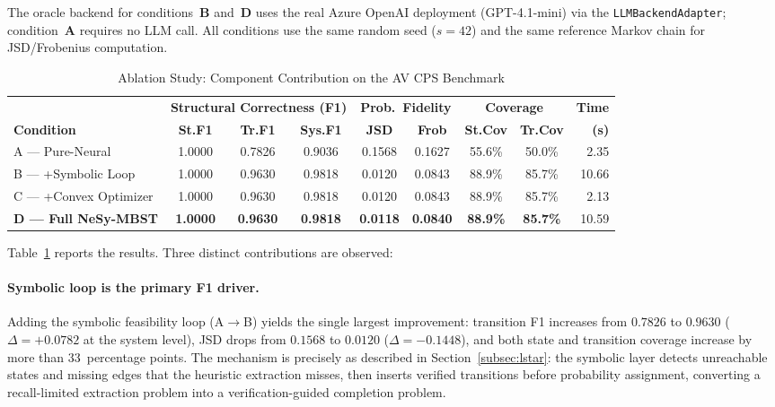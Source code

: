 The oracle backend for conditions~\textbf{B} and~\textbf{D} uses the
real Azure OpenAI deployment (GPT-4.1-mini) via the \texttt{LLMBackendAdapter};
condition~\textbf{A} requires no LLM call.  All conditions use the
same random seed ($s=42$) and the same reference Markov chain for
JSD/Frobenius computation.

\begin{table}[!t]
\centering
\caption{Ablation Study: Component Contribution on the AV CPS Benchmark}%
\label{tab:ablation}
\renewcommand{\arraystretch}{1.15}
\begin{tabular}{l ccc cc cc r}
\hline\hline
 & \multicolumn{3}{c}{\textbf{Structural Correctness (F1)}}
 & \multicolumn{2}{c}{\textbf{Prob.\ Fidelity}}
 & \multicolumn{2}{c}{\textbf{Coverage}}
 & \textbf{Time} \\
\cmidrule(lr){2-4}\cmidrule(lr){5-6}\cmidrule(lr){7-8}\cmidrule(lr){9-9}
\textbf{Condition}
  & \textbf{St.F1} & \textbf{Tr.F1} & \textbf{Sys.F1}
  & \textbf{JSD} & \textbf{Frob}
  & \textbf{St.Cov} & \textbf{Tr.Cov}
  & \textbf{(s)} \\
\hline
A — Pure-Neural
  & 1.0000 & 0.7826 & 0.9036
  & 0.1568 & 0.1627
  & 55.6\% & 50.0\%
  & 2.35 \\
B — +Symbolic Loop
  & 1.0000 & 0.9630 & 0.9818
  & 0.0120 & 0.0843
  & 88.9\% & 85.7\%
  & 10.66 \\
C — +Convex Optimizer
  & 1.0000 & 0.9630 & 0.9818
  & 0.0120 & 0.0843
  & 88.9\% & 85.7\%
  & 2.13 \\
\textbf{D — Full NeSy-MBST}
  & \textbf{1.0000} & \textbf{0.9630} & \textbf{0.9818}
  & \textbf{0.0118} & \textbf{0.0840}
  & \textbf{88.9\%} & \textbf{85.7\%}
  & 10.59 \\
\hline\hline
\end{tabular}
\end{table}

Table~\ref{tab:ablation} reports the results.  Three distinct
contributions are observed:

\paragraph{Symbolic loop is the primary F1 driver.}
Adding the symbolic feasibility loop (A$\to$B) yields the single
largest improvement: transition F1 increases from $0.7826$ to
$0.9630$ ($\Delta = +0.0782$ at the system level), JSD drops from
$0.1568$ to $0.0120$ ($\Delta = -0.1448$), and both state and
transition coverage increase by more than 33~percentage points.  The
mechanism is precisely as described in
Section~\ref{subsec:lstar}: the symbolic layer detects unreachable
states and missing edges that the heuristic extraction misses, then
inserts verified transitions before probability assignment, converting
a recall-limited extraction problem into a verification-guided
completion problem.


